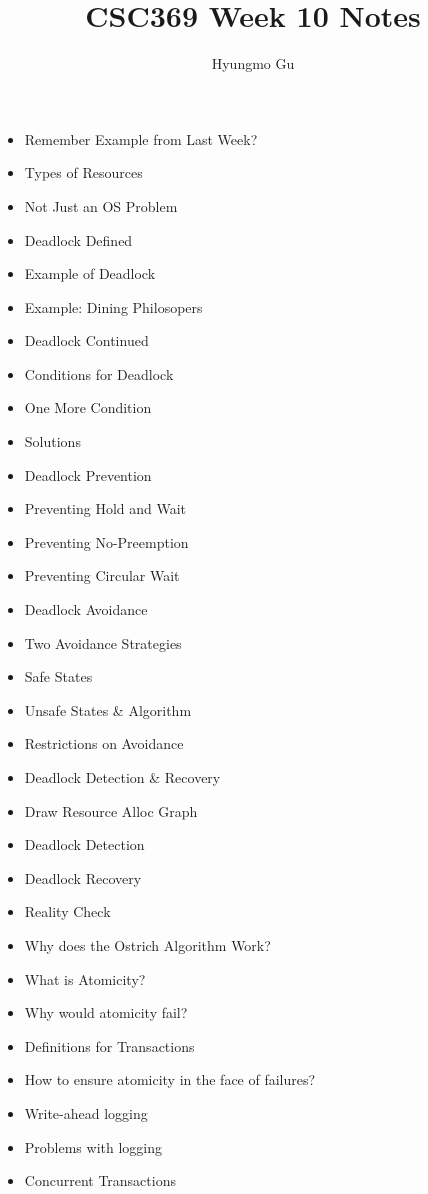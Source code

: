 \documentclass[12pt]{article}
\begin{document}
\title{CSC369 Week 10 Notes}
\author{Hyungmo Gu}
\maketitle

\begin{itemize}
    \item Remember Example from Last Week?
    \item Types of Resources
    \item Not Just an OS Problem
    \item Deadlock Defined
    \item Example of Deadlock
    \item Example: Dining Philosopers
    \item Deadlock Continued
    \item Conditions for Deadlock
    \item One More Condition
    \item Solutions
    \item Deadlock Prevention
    \item Preventing Hold and Wait
    \item Preventing No-Preemption
    \item Preventing Circular Wait
    \item Deadlock Avoidance
    \item Two Avoidance Strategies
    \item Safe States
    \item Unsafe States \& Algorithm
    \item Restrictions on Avoidance
    \item Deadlock Detection \& Recovery
    \item Draw Resource Alloc Graph
    \item Deadlock Detection
    \item Deadlock Recovery
    \item Reality Check
    \item Why does the Ostrich Algorithm Work?
    \item What is Atomicity?
    \item Why would atomicity fail?
    \item Definitions for Transactions
    \item How to ensure atomicity in the face of failures?
    \item Write-ahead logging
    \item Problems with logging
    \item Concurrent Transactions

\end{itemize}
\end{document}
